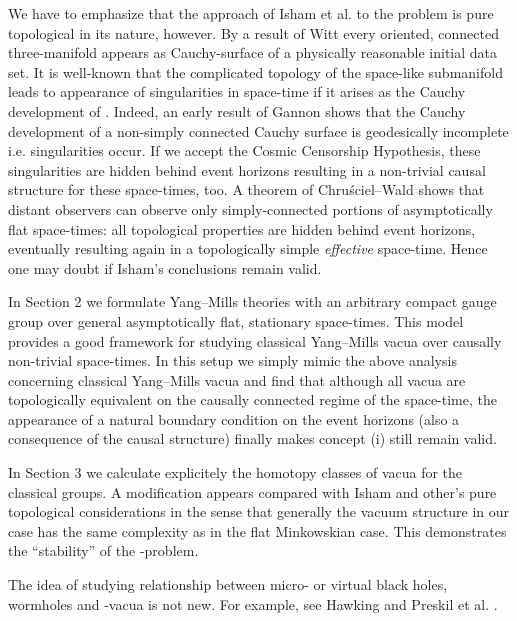 \documentclass[a4paper,12pt,draft]{article}
\begin{document}
We have to emphasize that the approach of Isham et al. to the problem is
pure topological in its nature, however. By a result of Witt \cite{wit}
every oriented, connected three-manifold \coordHE{} appears as Cauchy-surface
of a physically reasonable initial data set. It is well-known
that the complicated topology of the space-like submanifold \coordHE{} leads to
appearance of singularities in space-time if it arises as the
Cauchy development of \coordHE{}. Indeed, an early result of Gannon \cite{gan}
shows that the Cauchy development of a non-simply connected Cauchy surface
is geodesically incomplete i.e. singularities occur. If we accept the
Cosmic Censorship Hypothesis, these singularities are hidden behind event
horizons resulting in a non-trivial causal structure for these
space-times, too. A theorem of Chru\'sciel--Wald \cite{chr-wal} shows that
distant observers can observe only simply-connected portions of 
asymptotically flat space-times: all topological properties are hidden
behind event horizons, eventually resulting again in a topologically
simple {\it effective} space-time. Hence one may doubt if Isham's
conclusions remain valid.

In Section 2 we formulate Yang--Mills theories with 
an arbitrary compact gauge group over general asymptotically flat,
stationary space-times. This model provides a good framework for 
studying classical Yang--Mills vacua  over causally non-trivial
space-times. In this setup we simply mimic the above analysis concerning
classical Yang--Mills vacua and find that although
all vacua are topologically equivalent on the causally connected 
regime of the space-time, the appearance of a natural boundary condition
on the event horizons (also a consequence of the causal structure) finally
makes concept (i) still remain valid. 

In Section 3 we calculate explicitely the homotopy classes of vacua for
the classical groups. A modification appears compared with Isham and
other's pure topological considerations in the sense that
generally the vacuum structure in our case has the same complexity as in
the flat Minkowskian case. This demonstrates the ``stability'' of the
\myHighlight{$\theta$}\coordHE{}-problem.

The idea of studying relationship between micro- or virtual black
holes, wormholes and \myHighlight{$\theta$}\coordHE{}-vacua is not new. For example, see 
Hawking \cite{haw} and Preskil et al. \cite{pres-triv}.
\end{document}
